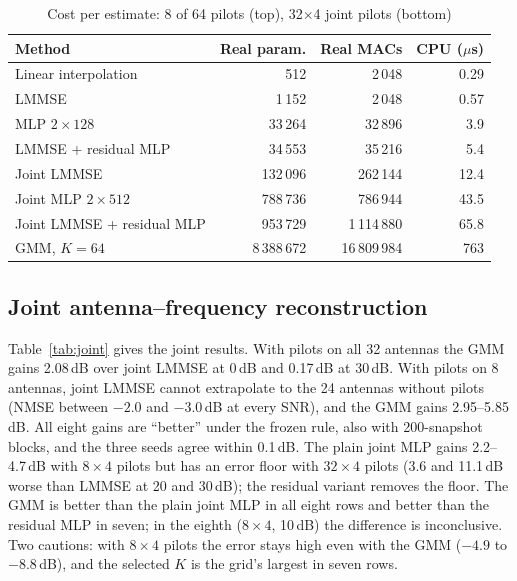 \documentclass[conference]{IEEEtran}
\begin{document}
\begin{table}[t]
\caption{Cost per estimate: 8 of 64 pilots (top), 32$\times$4 joint pilots (bottom)}
\label{tab:cost}
\centering\footnotesize
\setlength{\tabcolsep}{4pt}
\begin{tabular}{@{}lrrr@{}}
\toprule
Method & Real param. & Real MACs & CPU ($\mu$s)\\
\midrule
Linear interpolation & 512 & 2\,048 & 0.29\\
LMMSE & 1\,152 & 2\,048 & 0.57\\
MLP $2\times128$ & 33\,264 & 32\,896 & 3.9\\
LMMSE + residual MLP & 34\,553 & 35\,216 & 5.4\\
\midrule
Joint LMMSE & 132\,096 & 262\,144 & 12.4\\
Joint MLP $2\times512$ & 788\,736 & 786\,944 & 43.5\\
Joint LMMSE + residual MLP & 953\,729 & 1\,114\,880 & 65.8\\
GMM, $K=64$ & 8\,388\,672 & 16\,809\,984 & 763\\
\bottomrule
\end{tabular}
\end{table}

\subsection{Joint antenna--frequency reconstruction}
Table~\ref{tab:joint} gives the joint results. With pilots on all 32 antennas the GMM gains 2.08\,dB
over joint LMMSE at 0\,dB and 0.17\,dB at 30\,dB. With pilots on 8 antennas, joint LMMSE cannot
extrapolate to the 24 antennas without pilots (NMSE between $-2.0$ and $-3.0$\,dB at every SNR), and
the GMM gains 2.95--5.85\,dB. All eight gains are ``better'' under the frozen rule,
also with 200-snapshot blocks, and the three seeds agree within 0.1\,dB. The plain joint MLP gains
2.2--4.7\,dB with $8\times4$ pilots but has an error floor with $32\times4$ pilots (3.6 and 11.1\,dB worse
than LMMSE at 20 and 30\,dB); the residual variant removes the floor. The GMM is better than the plain
joint MLP in all eight rows and better than the residual MLP in seven; in the eighth ($8\times4$,
10\,dB) the difference is inconclusive. Two cautions: with $8\times4$ pilots the error stays high even
with the GMM ($-4.9$ to $-8.8$\,dB), and the selected $K$ is the grid's largest in seven rows.
\end{document}
